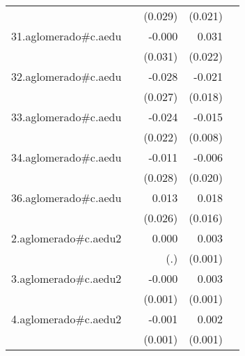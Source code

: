 {\begin{longtable}{l*{4}{D{.}{.}{-1}}}
            &                     &     (0.029)         &     (0.021)         &                     \\
\addlinespace
31.aglomerado#c.aedu&                     &      -0.000         &       0.031         &                     \\
            &                     &     (0.031)         &     (0.022)         &                     \\
\addlinespace
32.aglomerado#c.aedu&                     &      -0.028         &      -0.021         &                     \\
            &                     &     (0.027)         &     (0.018)         &                     \\
\addlinespace
33.aglomerado#c.aedu&                     &      -0.024         &      -0.015\sym{*}  &                     \\
            &                     &     (0.022)         &     (0.008)         &                     \\
\addlinespace
34.aglomerado#c.aedu&                     &      -0.011         &      -0.006         &                     \\
            &                     &     (0.028)         &     (0.020)         &                     \\
\addlinespace
36.aglomerado#c.aedu&                     &       0.013         &       0.018         &                     \\
            &                     &     (0.026)         &     (0.016)         &                     \\
\addlinespace
2.aglomerado#c.aedu2&                     &       0.000         &       0.003\sym{***}&                     \\
            &                     &         (.)         &     (0.001)         &                     \\
\addlinespace
3.aglomerado#c.aedu2&                     &      -0.000         &       0.003\sym{**} &                     \\
            &                     &     (0.001)         &     (0.001)         &                     \\
\addlinespace
4.aglomerado#c.aedu2&                     &      -0.001         &       0.002\sym{*}  &                     \\
            &                     &     (0.001)         &     (0.001)         &                     \\

\end{longtable}}
